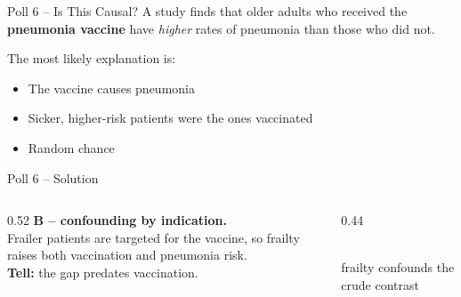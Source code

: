 \documentclass[aspectratio=169]{beamer}
\begin{document}
\begin{frame}{Poll 6 \;--\; Is This Causal?}
  \small
  A study finds that older adults who received the \textbf{pneumonia vaccine}
  have \emph{higher} rates of pneumonia than those who did not.
  \vspace{0.8em}

  The most likely explanation is:
  \begin{itemize}
    \item[\textbf{A.}] The vaccine causes pneumonia
    \item[\textbf{B.}] Sicker, higher-risk patients were the ones vaccinated
    \item[\textbf{C.}] Random chance
  \end{itemize}
\end{frame}

\begin{frame}{Poll 6 \;--\; Solution}
  \small
  \begin{columns}[T]
    \begin{column}{0.52\textwidth}
      \textcolor{good}{\textbf{B -- confounding by indication.}}\\[0.4em]
      Frailer patients are targeted for the vaccine, so frailty raises both
      vaccination and pneumonia risk.\\[0.4em]
      \textcolor{accent}{\textbf{Tell:}} the gap predates vaccination.
    \end{column}
    \begin{column}{0.44\textwidth}
      \centering
      \\[0.3em]
      {\scriptsize frailty confounds the crude contrast}
    \end{column}
  \end{columns}
\end{frame}
\end{document}
